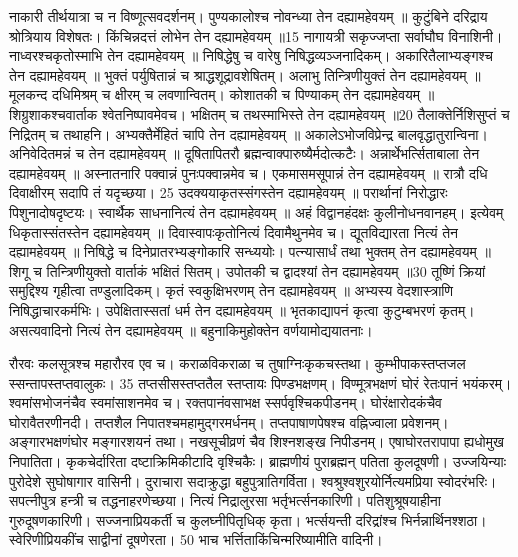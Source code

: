 नाकारी तीर्थयात्रा च न विष्णूत्सवदर्शनम्।
 पुण्यकालोश्च नोवन्ध्या तेन दह्यामहेवयम् ॥ कुटुंबिने दरिद्राय श्रोत्रियाय विशेषतः।
 किंचिन्नदत्तं लोभेन तेन दह्यामहेवयम् ॥15 नागायत्री सकृज्जप्ता सर्वाघौघ विनाशिनी।
 नाध्वरश्चकृतोस्माभि तेन दह्यामहेवयम् ॥ निषिद्धेषु च वारेषु निषिद्धव्यञ्जनादिकम्।
 अकारितैलाभ्यङ्गश्च तेन दह्यामहेवयम् ॥ भुक्तं पर्युषितान्नं च श्राद्धशूद्रावशेषितम्।
 अलाभु तिन्त्रिणीयुक्तं तेन दह्यामहेवयम् ॥ मूलकन्द दधिमिश्रम् च क्षीरम् च लवणान्वितम्।
 कोशातकी च पिण्याकम् तेन दह्यामहेवयम् ॥ शिग्रुशाकश्चवार्ताक श्वेतनिष्पावमेवच।
 भक्षितम् च तथस्माभिस्ते तेन दह्यामहेवयम् ॥20 तैलाक्तेर्निशिसुप्तं च निद्रितम् च तथाहनि।
 अभ्यक्तैर्मेहितं चापि तेन दह्यामहेवयम् ॥ अकालेऽभोजविप्रेन्द्र बालवृद्धातुरान्विना।
 अनिवेदितमन्नं च तेन दह्यामहेवयम् ॥ दूषितापितरौ ब्रह्मन्वाक्पारुष्यैर्मदोत्कटैः।
 अन्नार्थेभर्त्सिताबाला तेन दह्यामहेवयम् ॥ अस्नातनारि पक्वान्नं पुनःपक्वान्नमेव च।
 एकमासमसूपान्नं तेन दह्यामहेवयम् ॥
रात्रौ दधि दिवाक्षीरम् सदापि तं यदृच्छया।
25 उदक्ययाकृतस्संगस्तेन दह्यामहेवयम् ॥ परार्थानां निरोद्धारः पिशुनादोषदृष्टयः।
 स्वार्थैक साधनानित्यं तेन दह्यामहेवयम् ॥ अहं विद्वानहंदक्षः कुलीनोधनवानहम्।
 इत्येवम् धिकृतास्संतस्तेन दह्यामहेवयम् ॥ दिवास्वापःकृतोनित्यं दिवामैथुनमेव च।
 द्यूतविद्यारता नित्यं तेन दह्यामहेवयम् ॥ निषिद्धे च दिनेप्रातरभ्यङ्गोकारि सन्ध्ययोः।
 पत्न्यासार्धं तथा भुक्तम् तेन दह्यामहेवयम् ॥ शिगू च तिन्त्रिणीयुक्तो वार्ताकं भक्षितं सितम्।
 उपोतकी च द्वादश्यां तेन दह्यामहेवयम् ॥30 तूष्णिं क्रियां समुद्दिश्य गृहीत्वा तण्डुलादिकम्।
 कृतं स्वकुक्षिभरणम् तेन दह्यामहेवयम् ॥ अभ्यस्य वेदशास्त्राणि निषिद्धाचारकर्मभिः।
 उपेक्षितास्सतां धर्म तेन दह्यामहेवयम् ॥ भृतकाद्यापनं कृत्वा कुटुम्बभरणं कृतम्।
 असत्यवादिनो नित्यं तेन दह्यामहेवयम् ॥ बहुनाकिमुहोक्तेन वर्णयामोद्ययातनाः।
 
रौरवः कलसूत्रश्च महारौरव एव च।
 कराळविकराळा च तुषाग्निःकृकचस्तथा।
 कुम्भीपाकस्तप्तजल स्सन्तापस्तप्तवालुकः।
 35
तप्तसीसस्तप्ततैल स्तप्तायः पिण्डभक्षणम्।
 विण्मूत्रभक्षणं घोरं रेतःपानं भयंकरम्।
 श्वमांसभोजनंचैव स्वमांसाशनमेव च।
 रक्तपानंवसाभक्ष स्सर्पवृश्चिकपीडनम्।
 घोरंक्षारोदकंचैव घोरावैतरणीनदी।
 तप्तशैल निपातश्चमहामुद्गरमर्धनम्।
 तप्तपाषाणपेषश्च वह्निज्वाला प्रवेशनम्।
 अङ्गारभक्षणंघोर मङ्गारशयनं तथा।
 नखसूचीव्रणं चैव शिश्नशङ्ख निपीडनम्।
 एषाघोरतरापापा ह्यधोमुख निपातिता।
 कृकचेर्दारिता दष्टाक्रिमिकीटादि वृश्चिकैः।
 ब्राह्मणीयं पुराब्रह्मन् पतिता कुलदूषणी।
 उज्जयिन्याः पुरोदेशे सुघोषागार वासिनी।
 दुराचारा सदाक्रुद्धा बहुपुत्रातिगर्विता।
 श्वश्रुश्वशुरयोर्नित्यमप्रिया स्वोदरंभरिः।
 सपत्नीपुत्र हन्त्री च तद्धनाहरणेच्छया।
 नित्यं निद्रालुरसा भर्तृभर्त्सनकारिणी।
 पतिशुश्रूषयाहीना गुरुदूषणकारिणी।
 सज्जनाप्रियकर्ती च कुलघ्नीपितृधिक् कृता।
 भर्त्सयन्ती दरिद्रांश्च भिर्नन्नार्थिनश्शठा।
 स्वेरिणीप्रियकींच साद्वीनां दूषणेरता।
 50 भाच भर्त्तिताकिंचिन्मरिष्यामीति वादिनी।
 
